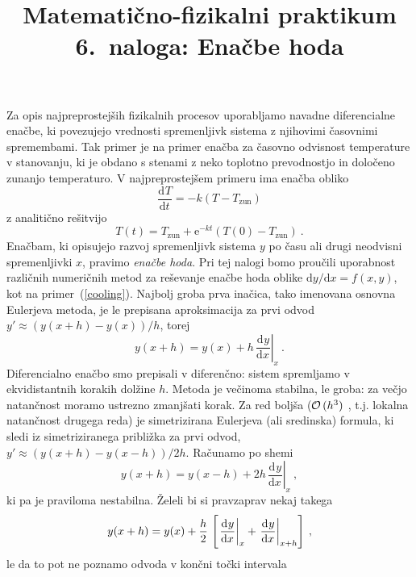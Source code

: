 \documentclass[slovene,11pt,a4paper]{article}
\title{
\sc\large Matematično-fizikalni praktikum \thisyear\\
\bigskip
\bf\Large 6.~naloga: Enačbe hoda
}
\author{}
\date{}
\newcommand{\ddd}{\mathrm{d}}
\newcommand{\Dd}[3][{}]{\frac{\ddd^{#1} #2}{\ddd #3^{#1}}}
\begin{document}
\maketitle
\vspace{-1cm}


Za opis najpreprostejših fizikalnih procesov uporabljamo
navadne diferencialne enačbe, ki povezujejo vrednosti
spremenljivk sistema z njihovimi časovnimi
spremembami. Tak primer je na primer enačba za časovno
odvisnost temperature v stanovanju, ki je obdano s stenami
z neko toplotno prevodnostjo in določeno zunanjo temperaturo.
V najpreprostejšem primeru ima enačba obliko
\begin{equation}
\Dd{T}{t} = - k \left( T-T_\mathrm{zun} \right)
\label{cooling}
\end{equation}
z analitično rešitvijo
\begin{equation*}
T(t) = T_\mathrm{zun} + \mathrm{e}^{-kt} \left( T(0) - T_\mathrm{zun} \right) \>.
\end{equation*}
Enačbam, ki opisujejo razvoj spremenljivk sistema $y$ po času ali drugi
neodvisni spremenljivki $x$, pravimo {\sl enačbe hoda\/}.  Pri tej
nalogi bomo proučili uporabnost različnih numeričnih metod
za reševanje enačbe hoda oblike $\ddd y/\ddd x = f(x, y)$,
kot na primer~(\ref{cooling}).   Najbolj groba
prva inačica, tako imenovana osnovna Eulerjeva metoda,
je le prepisana aproksimacija za prvi odvod
$y' \approx (y(x+h) - y(x)) / h$, torej
\begin{equation}
y(x+h) = y(x) + h\,\left.\Dd{y}{x}\right|_x \>.
\label{euler}
\end{equation}
Diferencialno enačbo smo prepisali
v diferenčno: sistem
spremljamo v ekvidistantnih korakih dolžine $h$. Metoda je
večinoma stabilna, le groba: za večjo natančnost moramo
ustrezno zmanjšati korak.   Za red boljša (${\cal O}\,(h^3 )$ , t.j. lokalna natančnost drugega reda)
je simetrizirana Eulerjeva (ali sredinska) formula, ki sledi
iz simetriziranega približka za prvi odvod,
$y' \approx (y(x+h) - y(x-h)) / 2h$.  Računamo po shemi
\begin{equation}
y(x+h) = y(x-h) + 2h\,\left.\Dd{y}{x}\right|_x \>,
\label{seuler}
\end{equation}
ki pa je praviloma nestabilna.  Želeli bi si
pravzaprav nekaj takega
\begin{equation}
y(x+h) = y(x) + {h\over 2}\,\left[\left.\Dd{y}{x}\right|_x
+ \left.\Dd{y}{x}\right|_{x+h} \right] \>,
\label{impeuler}
\end{equation}
le da to pot ne poznamo odvoda v končni točki intervala
\end{document}
